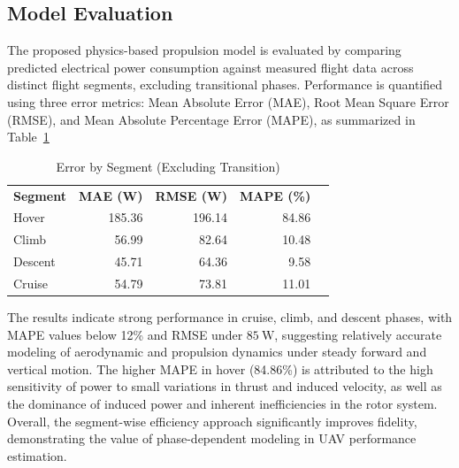 \subsection{Model Evaluation}

The proposed physics-based propulsion model is evaluated by comparing predicted electrical power consumption against measured flight data across distinct flight segments, excluding transitional phases. Performance is quantified using three error metrics: Mean Absolute Error (MAE), Root Mean Square Error (RMSE), and Mean Absolute Percentage Error (MAPE), as summarized in Table~\ref{tab:error_by_segment}

\begin{table}[tbhp]
\centering
\caption{Error by Segment (Excluding Transition)}
\label{tab:error_by_segment}
\begin{tabular}{lrrrr}
\textbf{Segment} & \textbf{MAE (W)} & \textbf{RMSE (W)} & \textbf{MAPE (\%)} \\
Hover      & 185.36 & 196.14 & 84.86 \\
Climb      & 56.99  & 82.64  & 10.48 \\
Descent    & 45.71  & 64.36  & 9.58 \\
Cruise     & 54.79  & 73.81  & 11.01 \\
\end{tabular}
\end{table}

The results indicate strong performance in cruise, climb, and descent phases, with MAPE values below 12\% and RMSE under $85~\text{W}$, suggesting relatively accurate modeling of aerodynamic and propulsion dynamics under steady forward and vertical motion. The higher MAPE in hover (84.86\%) is attributed to the high sensitivity of power to small variations in thrust and induced velocity, as well as the dominance of induced power and inherent inefficiencies in the rotor system. Overall, the segment-wise efficiency approach significantly improves fidelity, demonstrating the value of phase-dependent modeling in UAV performance estimation.
